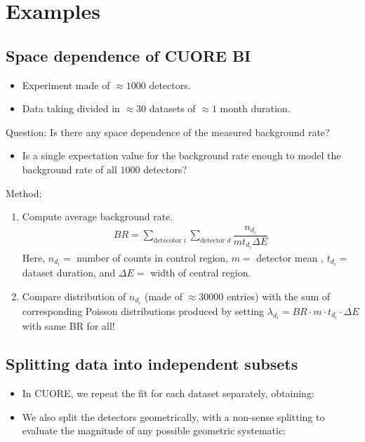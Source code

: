 \section{Examples}
\subsection{Space dependence of CUORE BI}
\begin{itemize}
  \item Experiment made of $\approx 1000$ detectors. 
  \item Data taking divided in $\approx 30$ datasets of $\approx 1$ month duration. 
\end{itemize}

Question: Is there any space dependence of the measured background rate? 
\begin{itemize}[$\to$]
  \item Is a single expectation value for the background rate enough to model the background rate of all $1000$ detectors?  
\end{itemize}

Method: \begin{enumerate}
  \item Compute average background rate. 
    \begin{align}
      BR = \sum \limits_{\text{detecotor } i} \sum \limits_{\text{detector } d} \dfrac{n_{d_i}}{m t_{d_i} \Delta E}
    \end{align}
    Here, $n_{d_i}=$ number of counts in control region, $m=$ detector mean , $t_{d_i}=$ dataset duration, and $\Delta E=$ width of central region.
  \item Compare distribution of $n_{d_i}$ (made of $\approx 30000$ entries) with the sum of corresponding Poisson distributions produced by setting $\lambda_{d_i}=BR \cdot m \cdot t_{d_i} \cdot \Delta E$ with same BR for all! 
\end{enumerate}

\subsection{Splitting data into independent subsets}
\begin{itemize}
  \item In CUORE, we repeat the fit for each dataset separately, obtaining: 
  \item We also split the detectors geometrically, with a non-sense splitting to evaluate the magnitude of any possible geometric systematic: 
\end{itemize}

